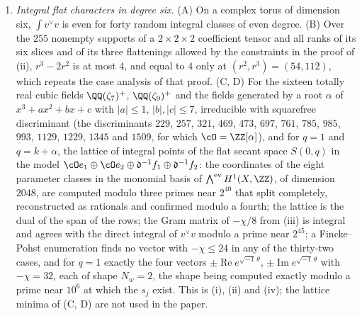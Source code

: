 \begin{enumerate}[label=\textup{(\Roman*)},leftmargin=*]
\item \emph{Integral flat characters in degree six.} (A) On a complex torus
  of dimension six, $\int v^{\vee}v$ is even for forty random integral
  classes of even degree. (B) Over the $255$ nonempty supports of a
  $2\times2\times2$ coefficient tensor and all ranks of its six slices and
  of its three flattenings allowed by the constraints in the proof of
  (ii), $r^{3}-2r^{2}$ is at most $4$, and equal to
  $4$ only at $(r^{2},r^{3})=(54,112)$, which repeats the case analysis of
  that proof. (C, D) For the sixteen totally real
  cubic fields $\QQ(\zeta_{7})^{+}$, $\QQ(\zeta_{9})^{+}$ and the fields
  generated by a root $\alpha$ of $x^{3}+ax^{2}+bx+c$ with $|a|\le1$,
  $|b|,|c|\le7$, irreducible with squarefree discriminant (the discriminants
  $229$, $257$, $321$, $469$, $473$, $697$, $761$, $785$, $985$, $993$,
  $1129$, $1229$, $1345$ and $1509$, for which $\cO=\ZZ[\alpha]$), and for
  $q=1$ and $q=k+\alpha$, the lattice of integral points of the flat secant
  space $S(0,q)$ in the model
  $\cO e_{1}\oplus\cO e_{2}\oplus\mathfrak d^{-1}f_{1}\oplus\mathfrak d^{-1}f_{2}$:
  the coordinates of the eight parameter classes in the monomial basis of
  $\bigwedge^{\mathrm{ev}}H^{1}(X,\ZZ)$, of dimension $2048$, are computed
  modulo three primes near $2^{40}$ that split completely, reconstructed as
  rationals and confirmed modulo a fourth; the lattice is the dual of the
  span of the rows; the Gram matrix of $-\chi/8$ from
  (iii) is integral and agrees with the direct
  integral of $v^{\vee}v$ modulo a prime near $2^{45}$; a Fincke--Pohst
  enumeration finds no vector with $-\chi\le24$ in any of the thirty-two
  cases, and for $q=1$ exactly the four vectors $\pm\operatorname{Re}
  e^{\sqrt{-1}\,\theta}$, $\pm\operatorname{Im}e^{\sqrt{-1}\,\theta}$ with
  $-\chi=32$, each of shape $N_{w}=2$, the shape being computed exactly
  modulo a prime near $10^{6}$ at which the $s_{j}$ exist. This is
  (i), (ii) and (iv); the lattice minima of (C, D)
  are not used in the paper.


\end{enumerate}
